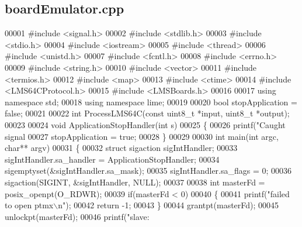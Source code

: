 \subsection{board\+Emulator.\+cpp}
\label{boardEmulator_8cpp_source}

\begin{DoxyCode}
00001 \textcolor{preprocessor}{#include <signal.h>}
00002 \textcolor{preprocessor}{#include <stdlib.h>}
00003 \textcolor{preprocessor}{#include <stdio.h>}
00004 \textcolor{preprocessor}{#include <iostream>}
00005 \textcolor{preprocessor}{#include <thread>}
00006 \textcolor{preprocessor}{#include <unistd.h>}
00007 \textcolor{preprocessor}{#include <fcntl.h>}
00008 \textcolor{preprocessor}{#include <errno.h>}
00009 \textcolor{preprocessor}{#include <string.h>}
00010 \textcolor{preprocessor}{#include <vector>}
00011 \textcolor{preprocessor}{#include <termios.h>}
00012 \textcolor{preprocessor}{#include <map>}
00013 \textcolor{preprocessor}{#include <ctime>}
00014 \textcolor{preprocessor}{#include <LMS64CProtocol.h>}
00015 \textcolor{preprocessor}{#include <LMSBoards.h>}
00016 
00017 \textcolor{keyword}{using namespace }std;
00018 \textcolor{keyword}{using namespace }lime;
00019 
00020 \textcolor{keywordtype}{bool} stopApplication = \textcolor{keyword}{false};
00021 
00022 \textcolor{keywordtype}{int} ProcessLMS64C(\textcolor{keyword}{const} uint8\_t *input, uint8\_t *output);
00023 
00024 \textcolor{keywordtype}{void} ApplicationStopHandler(\textcolor{keywordtype}{int} s)
00025 \{
00026     printf(\textcolor{stringliteral}{"Caught signal %
00027     stopApplication = \textcolor{keyword}{true};
00028 \}
00029 
00030 \textcolor{keywordtype}{int} main(\textcolor{keywordtype}{int} argc, \textcolor{keywordtype}{char}** argv)
00031 \{
00032     \textcolor{keyword}{struct }sigaction sigIntHandler;
00033     sigIntHandler.sa\_handler = ApplicationStopHandler;
00034     sigemptyset(&sigIntHandler.sa\_mask);
00035     sigIntHandler.sa\_flags = 0;
00036     sigaction(SIGINT, &sigIntHandler, NULL);
00037 
00038     \textcolor{keywordtype}{int} masterFd = posix\_openpt(O\_RDWR);
00039     \textcolor{keywordflow}{if}(masterFd < 0)
00040     \{
00041         printf(\textcolor{stringliteral}{"failed to open ptmx\(\backslash\)n"});
00042         \textcolor{keywordflow}{return} -1;
00043     \}
00044     grantpt(masterFd);
00045     unlockpt(masterFd);
00046     printf(\textcolor{stringliteral}{"slave: %
}}
\end{DoxyCode}

